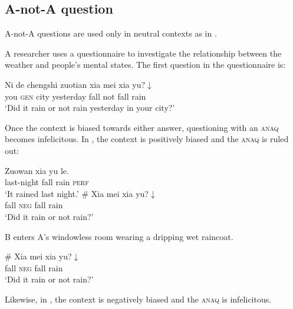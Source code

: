\documentclass[output=paper,colorlinks,citecolor=brown]{langscibook}
\begin{document}
	\subsection{A-not-A question}
	
	A-not-A questions are used only in neutral contexts as in .  
	
\begin{exe}
\ex\label{neutcon}  A researcher uses a questionnaire to investigate the relationship between the weather and people's mental states. The first question in the questionnaire is:
\begin{xlist}
\gll Ni de chengshi zuotian  xia mei xia yu?$\downarrow$\\
	you \textsc{gen} city yesterday fall not fall rain\\
\glt	`Did it rain or not rain  yesterday in your city?'
\end{xlist}
\end{exe}	

Once the context is biased towards either answer, questioning with an \textsc{anaq} becomes infelicitous.  In , the context is positively biased and the \textsc{anaq} is ruled out:
	
\begin{exe}
\ex\label{posca}
\begin{xlist}
\gll Zuowan  xia yu le.\\
	last-night  fall rain \textsc{perf}\\
\glt `It rained last night.'
\#\gll
	Xia mei xia yu?$\downarrow$\\
    fall \textsc{neg} fall rain\\
\glt `Did it rain or not rain?' 
\end{xlist}
\end{exe}		
		

\begin{exe}
\ex\label{posanonv}  B enters A's windowless room wearing a dripping wet raincoat.
\begin{xlist}
 \#\gll
Xia mei xia yu?$\downarrow$\\
fall \textsc{neg} fall rain\\
\glt `Did it rain or not rain?' 
	\end{xlist}
\end{exe}
	

	Likewise, in , the context is negatively biased and the \textsc{anaq} is infelicitous.
	
\end{document}
